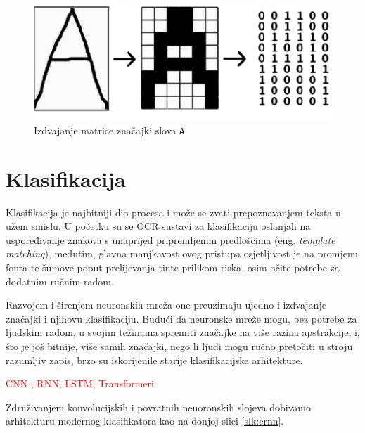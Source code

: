 \documentclass[zavrsnirad]{fer}
\begin{document}
\begin{figure}[hbt]
	\centering
	\includegraphics[width=0.9\linewidth]{Figures/simple-letter-matrix.png} 
	\caption{Izdvajanje matrice značajki slova \texttt{A} \cite{Noaman2015}}
	\label{slk:jednostavna-matrica}
\end{figure}


\section{Klasifikacija}

Klasifikacija je najbitniji dio procesa i može se zvati prepoznavanjem teksta u užem smislu. U početku su se OCR sustavi za klasifikaciju oslanjali na uspoređivanje znakova s unaprijed pripremljenim predlošcima (eng. \textit{template matching}), međutim, glavna manjkavost ovog pristupa osjetljivost je na promjenu fonta te šumove poput prelijevanja tinte prilikom tiska, osim očite potrebe za dodatnim ručnim radom.

Razvojem i širenjem neuronskih mreža one preuzimaju ujedno i izdvajanje značajki i njihovu klasifikaciju. Budući da neuronske mreže mogu, bez potrebe za ljudskim radom, u svojim težinama spremiti značajke na više razina apstrakcije, i, što je još bitnije, više samih značajki, nego li ljudi mogu ručno pretočiti u stroju razumljiv zapis, brzo su iskorijenile starije klasifikacijske arhitekture. \cite{Wang2012}

 \textcolor{red}{CNN \cite{Elagouni2014}, RNN, LSTM, Transformeri}

Združivanjem konvolucijskih i povratnih neuoronskih slojeva dobivamo arhitekturu modernog klasifikatora kao na donjoj slici \ref{slk:crnn}.
\end{document}
